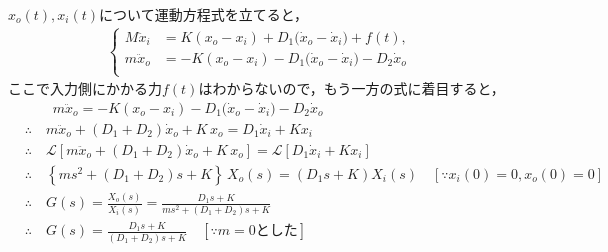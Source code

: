\documentclass[a4paper,12pt]{article}
\begin{document}
\begin{tcolorbox}
    \({x}_o(t),{x}_i(t)\)について運動方程式を立てると，
    \begin{align*}
        \left\{
            \begin{aligned}
                M\ddot{x}_i &= K(x_o - x_i) + D_1\bigl(\dot{x}_o-\dot{x}_i\bigr)+ f(t),\\
                m\ddot{x}_o &= - K(x_o - x_i) - D_1\bigl(\dot{x}_o-\dot{x}_i\bigr) - D_2 \dot{x}_o\\
            \end{aligned}
        \right.
    \end{align*}
        ここで入力側にかかる力\(f(t)\)はわからないので，もう一方の式に着目すると，
    \begin{align*}
        &\qquad m\ddot{x}_o = - K(x_o - x_i) - D_1\bigl(\dot{x}_o-\dot{x}_i\bigr) - D_2 \dot{x}_o \\
        &\therefore \quad m\ddot{x}_o + (D_1 +D_2) \dot{x}_o + K\,x_o = D_1 \dot{x}_i + K x_i\\
        &\therefore \quad \mathcal{L} \left[  m\ddot{x}_o + (D_1 +D_2) \dot{x}_o + K\,x_o  \right] 
        =\mathcal{L} \left[ D_1 \dot{x}_i + K x_i \right] \\
        &\therefore \quad \left\{m s^2 + (D_1+D_2) s + K\right\}\,X_o(s) 
        = (D_1s+K)X_i(s) \quad [\because x_i(0)= 0, x_o(0)=0 ]\\
        &\therefore \quad G(s) =\frac{X_o(s)}{X_i(s)}
        =\frac{D_1s+K}{m s^2 + (D_1+D_2) s + K}\\
        &\therefore \quad G(s) 
        = \frac{D_1s+K}{(D_1+D_2) s + K}\quad [\because m=0\text{とした}]
    \end{align*}

\end{tcolorbox}
\newpage
\end{document}
